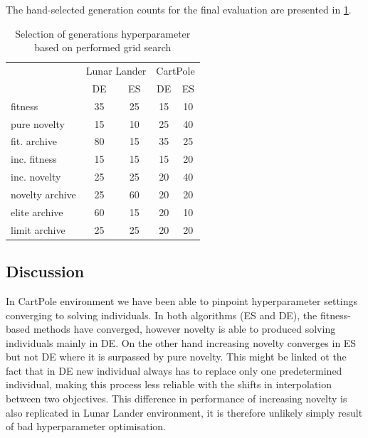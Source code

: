 The hand-selected generation counts for the final evaluation are presented in \cref{tab:gridResults}.  

\begin{table}[h]
	\centering
	\scriptsize
	\setlength{\tabcolsep}{4pt}
	\renewcommand{\arraystretch}{1.15}
	\begin{tabular}{l||cc|cc}
		\toprule
		{} & \multicolumn{2}{l}{Lunar Lander} & \multicolumn{2}{l}{CartPole} \\
		{} &           DE &  ES &       DE &  ES \\
		\midrule
		fitness         &           35 &  25 &       15 &  10 \\
		pure novelty    &           15 &  10 &       25 &  40 \\
		fit. archive    &           80 &  15 &       35 &  25 \\
		inc. fitness    &           15 &  15 &       15 &  20 \\
		inc. novelty    &           25 &  25 &       20 &  40 \\
		novelty archive &           25 &  60 &       20 &  20 \\
		elite archive   &           60 &  15 &       20 &  10 \\
		limit archive   &           25 &  25 &       20 &  20 \\
		\bottomrule
	\end{tabular}
	
	\caption{Selection of generations hyperparameter based on performed grid search}
	\label{tab:gridResults}
\end{table}

\subsection{Discussion}
In CartPole environment we have been able to pinpoint hyperparameter settings converging to solving individuals. In both algorithms (ES and DE), the fitness-based methods have converged, however novelty is able to produced solving individuals mainly in DE. On the other hand increasing novelty converges in ES but not DE where it is surpassed by pure novelty. This might be linked ot the fact that in DE new individual always has to replace only one predetermined individual, making this process less reliable with the shifts in interpolation between two objectives. This difference in performance of increasing novelty is also replicated in Lunar Lander environment, it is therefore unlikely simply result of bad hyperparameter optimisation.

